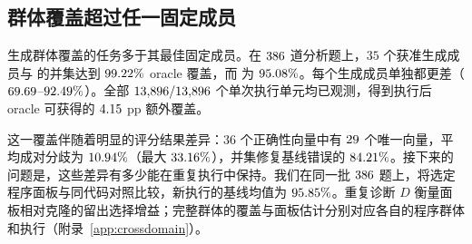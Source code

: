 \subsection{群体覆盖超过任一固定成员}
\label{sec:f2-headroom}
生成群体覆盖的任务多于其最佳固定成员。在 $386$ 道分析题上，$35$ 个获准生成成员与 \bare{} 的并集达到 $99.22\%$ oracle 覆盖，而 \bare{} 为 $95.08\%$。每个生成成员单独都更差（$69.69$--$92.49\%$）。全部 $13{,}896/13{,}896$ 个单次执行单元均已观测，得到执行后 oracle 可获得的 $4.15$ pp 额外覆盖。

这一覆盖伴随着明显的评分结果差异：$36$ 个正确性向量中有 $29$ 个唯一向量，平均成对分歧为 $10.94\%$（最大 $33.16\%$），并集修复基线错误的 $84.21\%$。接下来的问题是，这些差异有多少能在重复执行中保持。我们在同一批 $386$ 题上，将选定程序面板与同代码对照比较，新执行的基线均值为 $95.85\%$。重复诊断 $D$ 衡量面板相对克隆的留出选择增益；完整群体的覆盖与面板估计分别对应各自的程序群体和执行（附录~\ref{app:crossdomain}）。
